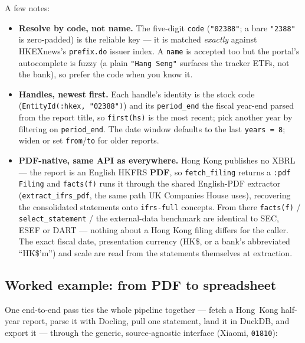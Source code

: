 \documentclass[11pt,a4paper]{report}
\begin{document}
\noindent A few notes:

\begin{itemize}
  \item \textbf{Resolve by code, not name.} The five-digit \texttt{code} (\texttt{"02388"}; a bare
    \texttt{"2388"} is zero-padded) is the reliable key --- it is matched \emph{exactly} against HKEXnews's
    \texttt{prefix.do} issuer index. A \texttt{name} is accepted too but the portal's autocomplete is fuzzy
    (a plain \texttt{"Hang Seng"} surfaces the tracker ETFs, not the bank), so prefer the code when you know it.
  \item \textbf{Handles, newest first.} Each handle's identity is the stock code
    (\texttt{EntityId(:hkex,\ "02388")}) and its \texttt{period\_end} the fiscal year-end parsed from the
    report title, so \texttt{first(hs)} is the most recent; pick another year by filtering on
    \texttt{period\_end}. The date window defaults to the last \texttt{years\ =\ 8}; widen or set
    \texttt{from}/\texttt{to} for older reports.
  \item \textbf{PDF-native, same API as everywhere.} Hong Kong publishes no XBRL --- the report is an English
    HKFRS \textbf{PDF}, so \texttt{fetch\_filing} returns a \texttt{:pdf} \texttt{Filing} and \texttt{facts(f)}
    runs it through the shared English-PDF extractor (\texttt{extract\_ifrs\_pdf}, the same path UK Companies
    House uses), recovering the consolidated statements onto \texttt{ifrs-full} concepts. From there
    \texttt{facts(f)} / \texttt{select\_statement} / the external-data benchmark are identical to SEC, ESEF or
    DART --- nothing about a Hong Kong filing differs for the caller. The exact fiscal date, presentation
    currency (HK\$, or a bank's abbreviated ``HK\$'m'') and scale are read from the statements themselves at
    extraction.
\end{itemize}

\subsection{Worked example: from PDF to spreadsheet}\label{sec:hk-workflow}

One end-to-end pass ties the whole pipeline together --- fetch a Hong~Kong half-year report, parse it with
Docling, pull one statement, land it in DuckDB, and export it --- through the generic, source-agnostic
interface (Xiaomi, \texttt{01810}):
\end{document}
